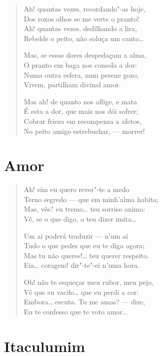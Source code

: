 \begin{verse}
Ah! quantas vezes, recordando"-as hoje,\\
Dos roxos olhos se me verte o pranto!\\
Ah! quantas vezes, dedilhando a lira,\\
Rebelde o peito, não soluça um canto\ldots{}

Mas, se essas dores despedaçam a alma,\\
O pranto em baga nos consola a dor:\\
Numa outra esfera, num perene gozo,\\
Vivem, partilham divinal amor.

Mas ah! de quanto nos aflige, e mata\\
É esta a dor, que mais nos dói sofrer;\\
Cobrar frieza em recompensa a afetos,\\
No peito amigo estrebuchar, --- morrer!
\end{verse}

\chapter{Amor}

\begin{verse}
Ah! sim eu quero rever"-te a medo\\
Terno segredo --- que em minh'alma habita;\\
Mas, vês? eu tremo\ldots{} teu sorriso anima:\\
Vê, se o que digo, o teu dizer imita\ldots{}

Um ai poderá traduzir --- n'um ai\\
Tudo o que pedes que eu te diga agora;\\
Mas tu não queres!\ldots{} teu querer respeito.\\
Eia\ldots{} coragem! dir"-te"-ei n'uma hora.

Oh! não te esqueças meu rubor, meu pejo,\\
Vê que eu vacilo\ldots{} que eu perdi a cor:\\
Embora\ldots{} escuta. Tu me amas? --- dize,\\
Eu te confesso que te voto amor\ldots{}
\end{verse}

\chapter{Itaculumim}

